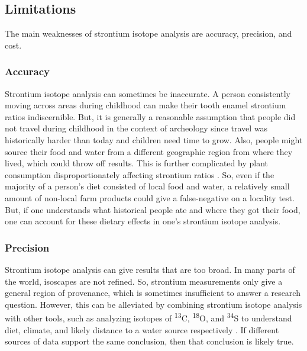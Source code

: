 \documentclass[a4paper, 12pt]{article}
\begin{document}
\subsection{Limitations}
The main weaknesses of strontium isotope analysis are accuracy, precision, and cost.
\subsubsection{Accuracy}
Strontium isotope analysis can sometimes be inaccurate. A person consistently moving
across areas during childhood can make their tooth enamel strontium ratios indiscernible.
But, it is generally a reasonable assumption that people did not travel during childhood
in the context of archeology since travel was historically harder than today and children need time to grow.
Also, people might source their food and water from a different geographic region from where
they lived, which could throw off results.
This is further complicated by plant consumption disproportionately affecting strontium ratios \citep{price2006}.
So, even if the majority of a
person's diet consisted of local food and water, a relatively
small amount of non-local farm products could give a false-negative on a locality test.
But, if one understands what historical people ate and where they got their food,
one can account for these dietary effects in one's strontium isotope analysis.



\subsubsection{Precision}
Strontium isotope analysis can give results that are too broad. In many parts of the world, isoscapes are not
refined.
So, strontium measurements only give a general region of provenance, which is sometimes insufficient to answer a research question.
However, this can be alleviated by combining strontium isotope analysis with other tools,
such as analyzing isotopes of \textsuperscript{13}C, \textsuperscript{18}O, and \textsuperscript{34}S
to understand diet, climate, and likely distance to a water source respectively \citep{madgwick2019}.
If different sources of data support the same conclusion, then that conclusion
is likely true.
\end{document}
